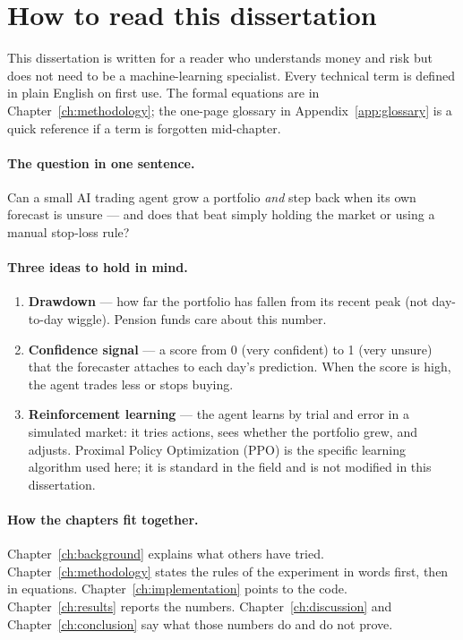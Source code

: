
\section*{How to read this dissertation}

This dissertation is written for a reader who understands money and risk but does not need to be a machine-learning specialist. Every technical term is defined in plain English on first use. The formal equations are in Chapter~\ref{ch:methodology}; the one-page glossary in Appendix~\ref{app:glossary} is a quick reference if a term is forgotten mid-chapter.

\paragraph{The question in one sentence.} Can a small AI trading agent grow a portfolio \emph{and} step back when its own forecast is unsure --- and does that beat simply holding the market or using a manual stop-loss rule?

\paragraph{Three ideas to hold in mind.}
\begin{enumerate}[leftmargin=*]
  \item \textbf{Drawdown} --- how far the portfolio has fallen from its recent peak (not day-to-day wiggle). Pension funds care about this number.
  \item \textbf{Confidence signal} --- a score from 0 (very confident) to 1 (very unsure) that the forecaster attaches to each day's prediction. When the score is high, the agent trades less or stops buying.
  \item \textbf{Reinforcement learning} --- the agent learns by trial and error in a simulated market: it tries actions, sees whether the portfolio grew, and adjusts. Proximal Policy Optimization (PPO) is the specific learning algorithm used here; it is standard in the field and is not modified in this dissertation.
\end{enumerate}

\paragraph{How the chapters fit together.} Chapter~\ref{ch:background} explains what others have tried. Chapter~\ref{ch:methodology} states the rules of the experiment in words first, then in equations. Chapter~\ref{ch:implementation} points to the code. Chapter~\ref{ch:results} reports the numbers. Chapter~\ref{ch:discussion} and Chapter~\ref{ch:conclusion} say what those numbers do and do not prove.


